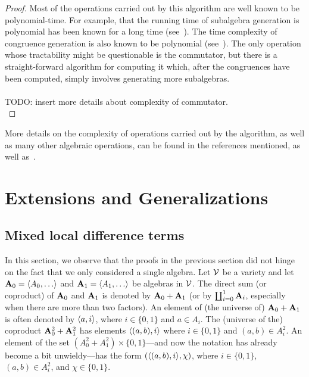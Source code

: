 \begin{proof}
    Most of the operations carried out by this algorithm are well known to be
    polynomial-time.  For example, that the running time of subalgebra generation is
    polynomial has been known for a long time (see~\cite{MR0455543}).
    The time complexity of congruence generation is also known to be polynomial
    (see~\cite{MR2470585}).  The only operation whose tractability might be 
    questionable is the commutator, but there is a straight-forward algorithm for
    computing it which, after the congruences have been computed, simply
    involves generating more subalgebras.
    \\\\
    TODO: insert more details about complexity of commutator.\\
\end{proof}


More details on the complexity of operations carried out by the algorithm, as well as many other algebraic operations, can be found in the references mentioned, as well as~\cite{MR1871085,MR1695293,Freese:2009}. 


\section{Extensions and Generalizations}


\subsection{Mixed local difference terms}
\label{sec:mixed-local-diff}
In this section, we observe that the proofs in the previous section
did not hinge on the fact that we only considered a single algebra.  
Let $\mathcal{V}$ be a variety and let $\bA_0=\< A_0, \dots\>$ and  $\bA_1=\< A_1, \dots\>$ be
algebras in $\mathcal{V}$.
The direct sum (or coproduct) of $\mathbf{A}_0$ and
$\mathbf{A}_1$ is denoted by $\mathbf{A}_0 + \mathbf{A}_1$
(or by $\coprod_{i=0}^1 \mathbf{A}_i$, especially when there are more than two
factors).
An element of (the universe of)
$\mathbf{A}_0 + \mathbf{A}_1$ is often denoted by $\langle a, i\rangle$,
where $i\in \{0,1\}$ and $a \in A_i$.
The (universe of the) coproduct %
$\mathbf{A}_0^2 + \mathbf{A}_1^2$ has elements
$\langle(a,b), i\rangle$ where $i\in \{0,1\}$ and $(a,b) \in A_i^2$.
An element of  the set $(A_0^2 + A_1^2) \times \{0,1\}$---and
now the notation has already become a bit unwieldy---has
the form $(\langle(a,b), i\rangle, \chi)$, where $i\in \{0,1\}$, $(a,b) \in A_i^2$,
and $\chi\in \{0,1\}$. 

